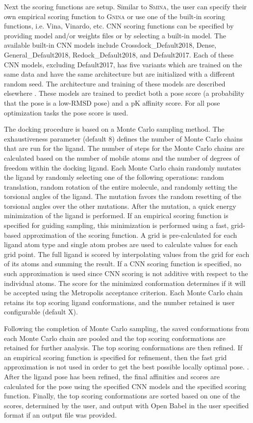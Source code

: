 \documentclass[journal=jcisd8,manuscript=article]{achemso}
\begin{document}
Next the scoring functions are setup. Similar to \textsc{Smina}, the user can specify their own empirical scoring function to \textsc{Gnina} or use one of the built-in scoring functions, i.e. Vina, Vinardo, etc. CNN scoring functions can be specified by providing model and/or weights files or by selecting a built-in model.  The available built-in CNN models include Crossdock\_Default2018, Dense, General\_Default2018, Redock\_Default2018, and Default2017. Each of these CNN models, excluding Default2017, has five variants which are trained on the same data and have the same architecture but are initialized with a different random seed. The architecture and training of these models are described elsewhere \cite{francoeur2020three,Ragoza2017}. These models are trained to predict both a pose score (a probability that the pose is a low-RMSD pose) and a pK affinity score.  For all pose optimization tasks the pose score is used.

The docking procedure is based on a Monte Carlo sampling method. The exhaustiveness parameter (default 8) defines the number of Monte Carlo chains that are run for the ligand. The number of steps for the Monte Carlo chains are calculated based on the number of mobile atoms and the number of degrees of freedom within the docking ligand. Each Monte Carlo chain randomly mutates the ligand by randomly selecting one of the following operations: random translation, random rotation of the entire molecule, and randomly setting the torsional angles of the ligand. The mutation favors the random resetting of the torsional angles over the other mutations. After the mutation, a quick energy minimization of the ligand is performed.  If an empirical scoring function is specified for guiding sampling, this minimization is performed using a fast, grid-based approximation of the scoring function.  A grid is pre-calculated for each ligand atom type and single atom probes are used to calculate values for each grid point.  The full ligand is scored by interpolating values from the grid for each of its atoms and summing the result.  If a CNN scoring function is specified, no such approximation is used since CNN scoring is not additive with respect to the individual atoms\cite{hochuli2018visualizing}.
 The score for the minimized conformation determines if it will be accepted using the Metropolis acceptance criterion. Each Monte Carlo chain retains its top scoring  ligand conformations, and the number retained is user configurable (default X).

Following the completion of Monte Carlo sampling, the saved conformations from each Monte Carlo chain are pooled and the top scoring conformations are retained for further analysis.  The top scoring conformations are then refined.  If an empirical scoring function is specified for refinement, then the fast grid approximation is not used in order to get the best possible locally optimal pose. . After the ligand pose has been refined, the final affinities and scores are calculated for the pose using the specified CNN models and the specified scoring function. Finally, the top scoring conformations are sorted based on one of the scores, determined by the user, and output with Open Babel in the user specified format if an output file was provided.
\end{document}
